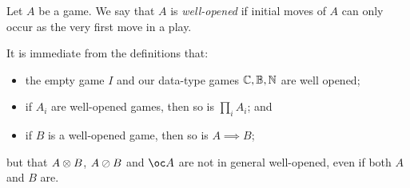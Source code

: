 \begin{definition}
  Let $A$ be a game.  
  We say that $A$ is \emph{well-opened} if initial moves of $A$ can only occur as the very first move in a play.
\end{definition}

It is immediate from the definitions that:
\begin{itemize}
  \item the empty game $I$ and our data-type games $\mathbb{C},\mathbb{B},\mathbb{N}$ are well opened;
  \item if $A_i$ are well-opened games, then so is $\prod_iA_i$; and
  \item if $B$ is a well-opened game, then so is $A \implies B$;
\end{itemize}
but that $A \otimes B$, $A\oslash B$ and $\oc A$ are not in general well-opened, even if both $A$ and $B$ are.

